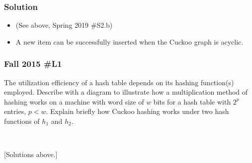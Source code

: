 \subsubsection{Solution}

\begin{itemize}
	\item (See above, Spring 2019 \#S2.b)
	\item A new item can be successfully inserted when the Cuckoo graph is acyclic.  
\end{itemize}


\subsubsection{Fall 2015 \#L1}

The utilization efficiency of a hash table depends on its hashing function(s) employed.  Describe with a diagram to illustrate how a multiplication method of hashing works on a machine with word size of $w$ bits for a hash table with $2^p$ entries, $p<w$.  Explain briefly how Cuckoo hashing works under two hash functions of $h_1$ and $h_2$.

\

[Solutions above.]



